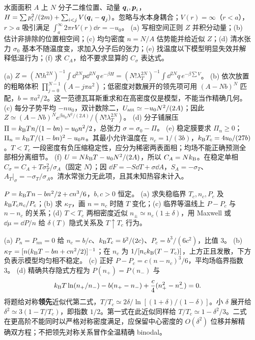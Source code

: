 \begin{exercise}
水面面积 $A$ 上 $N$ 分子二维位置、动量 $\boldsymbol{q}_i,\boldsymbol{p}_i$，$H=\sum p_i^2/(2m)+\sum_{i<j}V(\boldsymbol{q}_i-\boldsymbol{q}_j)$。忽略与水本身耦合；$V(r)=\infty$（$r<a$），$r>a$ 吸引满足 $\int_a^\infty2\pi rV(r)\dd r=-u_0$。
(a) 写相空间正则 $Z$ 并积分动量；(b) 估计非排除的位置相空间；(c) 均匀密度 $n=N/A$ 估势能并给近似 $Z$；(d) 清水张力 $\sigma_0$ 基本不随温度变，求加入分子后的张力；(e) 找温度以下模型明显失效并解释低温行为；(f) 求 $C_A$，给不要求显算的 $C_\sigma$ 表达式。
\end{exercise}
\begin{solution}
(a) $Z=(N!h^{2N})^{-1}\int\dd^{2N}p\dd^{2N}q\,e^{-\beta H}= (N!\lambda_T^{2N})^{-1}\int\dd^{2N}q\,e^{-\beta\sum V}$。
(b) 依次放置的粗略体积 $\prod_{j=0}^{N-1}(A-j\pi a^2)$；低密度对数展开的领先项可用 $(A-Nb)^N$ 匹配，$b=\pi a^2/2$。这一范德瓦耳斯重求和在高密度仅是模型，不能当作精确几何。
(c) 每分子势平均 $-nu_0$，双计数除二，$U_{\rm att}\simeq-u_0N^2/(2A)$；因此 $Z\simeq(A-Nb)^N e^{\beta u_0N^2/(2A)}/(N!\lambda_T^{2N})$。
(d) 分子铺展压 $\Pi=k_{\mathrm B} Tn/(1-bn)-u_0n^2/2$，总张力 $\sigma=\sigma_0-\Pi$。
(e) 稳定膜要求 $\Pi_n\ge0$；$\Pi_n=k_{\mathrm B} T/(1-bn)^2-u_0n$。其最小允许温度在 $n_c=1/(3b)$，$k_{\mathrm B} T_c=4u_0/(27b)$。$T<T_c$ 一段密度有负压缩稳定性，应分为稀密两表面相；均场不能正确预测全部相分离细节。
(f) $U=Nk_{\mathrm B} T-u_0N^2/(2A)$，所以 $C_A=Nk_{\mathrm B}$。在稳定单相 $C_\sigma=C_A+T\sigma_T^2/\sigma_A$（固定 $N$）；因 $\dd F=-S\dd T+\sigma\dd A$，$S_A=-\sigma_T$、$A_T|_\sigma=-\sigma_T/\sigma_A$。清水常张力无此项，且其未知热容未计入。
\end{solution}
\begin{exercise}
$P=k_{\mathrm B} Tn-bn^2/2+cn^3/6$，$b,c>0$ 恒定。
(a) 求失稳临界 $T_c,n_c,P_c$ 及 $k_{\mathrm B} T_cn_c/P_c$；(b) 求 $\kappa_T$，画 $n=n_c$ 时随 $T$ 变化；(c) 临界等温线上 $P-P_c$ 与 $n-n_c$ 的关系；(d) $T<T_c$ 两相密度近似 $n_\pm\simeq n_c(1\pm\delta)$，用 Maxwell 或 $\dd\mu=\dd P/n$ 给 $\delta(T)$ 隐式关系及 $T\uparrow T_c$ 行为。
\end{exercise}
\begin{solution}
(a) $P_n=P_{nn}=0$ 给 $n_c=b/c$、$k_{\mathrm B} T_c=b^2/(2c)$、$P_c=b^3/(6c^2)$，比值 3。
(b) $\kappa_T=[n(k_{\mathrm B} T-bn+cn^2/2)]^{-1}$；在 $n_c$ 为 $1/[n_ck_{\mathrm B}(T-T_c)]$，上方正且发散，下方负表示模型均匀相不稳定。
(c) 正好 $P-P_c=c(n-n_c)^3/6$，平均场临界指数 3。
(d) 精确共存隐式方程为 $P(n_+)=P(n_-)$ 与
\[k_{\mathrm B} T\ln(n_+/n_-)-b(n_+-n_-)+\frac c4(n_+^2-n_-^2)=0.\]
将题给对称\textbf{领先}近似代第二式，$T/T_c\simeq2\delta/\ln[(1+\delta)/(1-\delta)]$。小 $\delta$ 展开给 $\delta^2\simeq3(1-T/T_c)$，即指数 $1/2$。第一式在此近似同样给 $T/T_c\simeq1-\delta^2/3$。二式在更高阶不能同时以严格对称密度满足，应保留中心密度的 $O(\delta^2)$ 位移并解精确双方程；不把领先对称关系冒作全温精确 binodal。
\end{solution}
